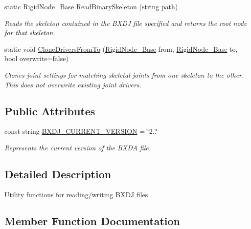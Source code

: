 \begin{DoxyCompactItemize}
static \hyperlink{class_rigid_node___base}{Rigid\+Node\+\_\+\+Base} \hyperlink{class_b_x_d_j_skeleton_aeacead12f7e921a9c77a588773901798}{Read\+Binary\+Skeleton} (string path)
\begin{DoxyCompactList}\small\item\em Reads the skeleton contained in the B\+X\+DJ file specified and returns the root node for that skeleton. \end{DoxyCompactList}\item 
static void \hyperlink{class_b_x_d_j_skeleton_a4db96cff0567e816d0f1c29426e0e70b}{Clone\+Drivers\+From\+To} (\hyperlink{class_rigid_node___base}{Rigid\+Node\+\_\+\+Base} from, \hyperlink{class_rigid_node___base}{Rigid\+Node\+\_\+\+Base} to, bool overwrite=false)
\begin{DoxyCompactList}\small\item\em Clones joint settings for matching skeletal joints from one skeleton to the other. This does not overwrite existing joint drivers. \end{DoxyCompactList}\end{DoxyCompactItemize}
\subsection*{Public Attributes}
\begin{DoxyCompactItemize}
\item 
const string \hyperlink{class_b_x_d_j_skeleton_ac20054504ce9c44576816cdf9882bd0e}{B\+X\+D\+J\+\_\+\+C\+U\+R\+R\+E\+N\+T\+\_\+\+V\+E\+R\+S\+I\+ON} = \char`\"{}2..\char`\"{}
\begin{DoxyCompactList}\small\item\em Represents the current version of the B\+X\+DA file. \end{DoxyCompactList}\end{DoxyCompactItemize}


\subsection{Detailed Description}
Utility functions for reading/writing B\+X\+DJ files 



\subsection{Member Function Documentation}
\mbox{\label{class_b_x_d_j_skeleton_a4db96cff0567e816d0f1c29426e0e70b}} 
